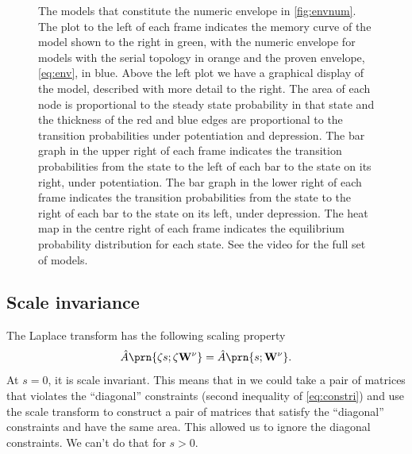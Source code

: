 \documentclass[12pt]{article}
\newcommand{\Wm}{W}
\newcommand{\W}{\mathbf{\Wm}}
\newcommand{\MMdm}{M}
\newcommand{\MMd}{\mathbf{\MMdm}}
\begin{document}
\begin{figure}[tbp]
\begin{myenuma}
  \end{myenuma}
  \caption[Optimal models]{The models that constitute the numeric envelope in \cref{fig:envnum}.
  The plot to the left of each frame indicates the memory curve of the model shown to the right in green, with the numeric envelope for models with the serial topology in orange and the proven envelope, \eqref{eq:env}, in blue.
  Above the left plot we have a graphical display of the model, described with more detail to the right.
  The area of each node is proportional to the steady state probability in that state and the thickness of the red and blue edges are proportional to the transition probabilities under potentiation and depression.
  The bar graph in the upper right of each frame indicates the transition probabilities from the state to the left of each bar to the state on its right, under potentiation.
  The bar graph in the lower right of each frame indicates the transition probabilities from the state to the right of each bar to the state on its left, under depression.
  The heat map in the centre right of each frame indicates the equilibrium probability distribution for each state.
  See the video for the full set of models.}\label{fig:envvid}
\end{figure}



\subsection{Scale invariance}\label{sec:scale}

The Laplace transform has the following scaling property
%
\begin{equation}\label{eq:laplacescale}
  \hat{A} \prn{\zeta s;\zeta \W^\nu} = \hat{A} \prn{s; \W^\nu}.
\end{equation}
%
At \(s = 0\), it is scale invariant.
This means that in \cite{Lahiri2013synapse} we could take a pair of matrices that violates the ``diagonal'' constraints (second inequality of \cref{eq:constri}) and use the scale transform to construct a pair of matrices that satisfy the ``diagonal'' constraints and have the same area.
This allowed us to ignore the diagonal constraints.
We can't do that for \(s > 0\).
\end{document}
